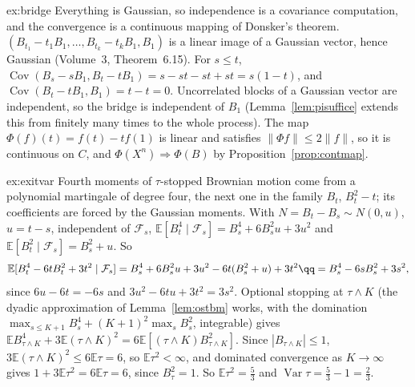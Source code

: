 \begin{solution}{ex:bridge}
\idea Everything is Gaussian, so independence is a covariance computation, and the convergence is a continuous mapping of Donsker's theorem.
\writeup $(B_{t_1}-t_1B_1,\dots,B_{t_k}-t_kB_1,B_1)$ is a linear image of a Gaussian vector, hence Gaussian (Volume~3, Theorem~6.15). For $s\le t$,
$\operatorname{Cov}(B_s-sB_1,B_t-tB_1)=s-st-st+st=s(1-t)$, and $\operatorname{Cov}(B_t-tB_1,B_1)=t-t=0$. Uncorrelated blocks of a Gaussian vector are independent, so the bridge is independent
of $B_1$ (Lemma~\ref{lem:pisuffice} extends this from finitely many times to the whole process). The map $\Phi(f)(t)=f(t)-tf(1)$ is linear and satisfies $\|\Phi f\|\le2\|f\|$, so it is
continuous on $C$, and $\Phi(X^n)\Rightarrow\Phi(B)$ by Proposition~\ref{prop:contmap}.
\end{solution}

\begin{solution}{ex:exitvar}
\idea Fourth moments of $\tau$-stopped Brownian motion come from a polynomial martingale of degree four, the next one in the family $B_t$, $B_t^2-t$; its coefficients are forced by
the Gaussian moments.
\writeup With $N=B_t-B_s\sim N(0,u)$, $u=t-s$, independent of $\mathcal F_s$, $\mathbb E[B_t^4\mid\mathcal F_s]=B_s^4+6B_s^2u+3u^2$ and $\mathbb E[B_t^2\mid\mathcal F_s]=B_s^2+u$. So
\[
\begin{gathered}
\mathbb E[B_t^4-6tB_t^2+3t^2\mid\mathcal F_s]=B_s^4+6B_s^2u+3u^2-6t(B_s^2+u)+3t^2\qq=B_s^4-6sB_s^2+3s^2,
\end{gathered}
\]
since $6u-6t=-6s$ and $3u^2-6tu+3t^2=3s^2$. Optional stopping at $\tau\wedge K$ (the dyadic approximation of Lemma~\ref{lem:ostbm} works, with the domination
$\max_{s\le K+1}B_s^4+(K+1)^2\max_sB_s^2$, integrable) gives $\mathbb E B_{\tau\wedge K}^4+3\mathbb E(\tau\wedge K)^2=6\mathbb E[(\tau\wedge K)B_{\tau\wedge K}^2]$. Since $|B_{\tau\wedge K}|\le1$,
$3\mathbb E(\tau\wedge K)^2\le6\mathbb E\tau=6$, so $\mathbb E\tau^2<\infty$, and dominated convergence as $K\to\infty$ gives $1+3\mathbb E\tau^2=6\mathbb E\tau=6$, since $B_\tau^2=1$. So $\mathbb E\tau^2=\frac53$
and $\operatorname{Var}\tau=\frac53-1=\frac23$.
\end{solution}

